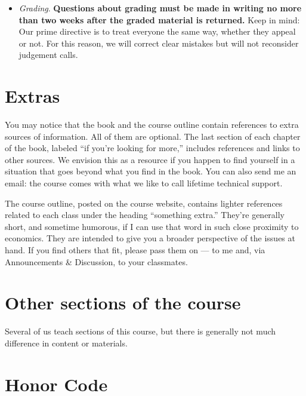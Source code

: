 \documentclass[12pt]{article}
\begin{document}
\begin{itemize}
\item \textit{Grading}.
{\bf Questions about grading must be made in writing no more than two weeks
after the graded material is returned.}
Keep in mind:  Our prime directive is to treat everyone the same way,
whether they appeal or not.
For this reason, we will correct clear mistakes but will not
reconsider judgement calls.

\end{itemize}

\section{Extras}

You may notice that the book and the course outline contain references to
extra sources of information.
All of them are optional.
The last section of each chapter of the book,
labeled ``if you're looking for more,''
includes references and links to other sources.
We envision this as a resource if you happen to find yourself in
a situation that goes beyond what you find in the book.
You can also send me an email:  the course comes with what we like
to call lifetime technical support.

The course outline, posted on the course website,
contains lighter references related to each class
under the heading ``something extra.''
They're generally short, and sometime humorous,
if I can use that word in such close proximity to economics.
They are intended
to give you a broader perspective of the issues at hand.
If you find others that fit, please pass them on ---
to me and, via Announcements \& Discussion, to your classmates.

\section{Other sections of the course}

Several of us teach sections of this course,
but there is generally not much difference in content or materials.


\section{Honor Code}
\end{document}
